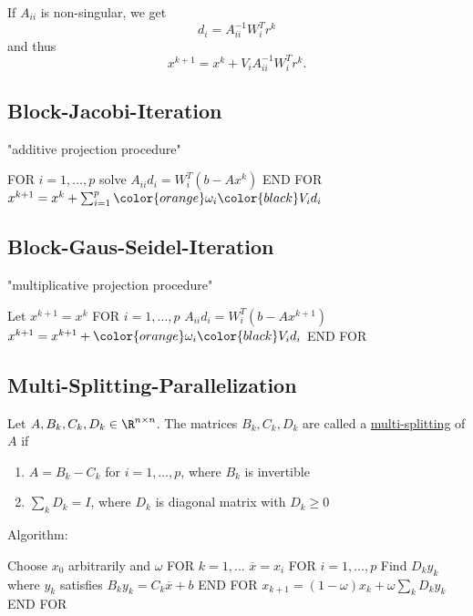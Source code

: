 If $A_{ii}$ is non-singular, we get
\[
d_{i} = A_{ii}^{-1} W_{i}^{T} r^{k}
\] 
and thus
\[
x^{k+1} = x^{k}+ V_{i}A_{ii}^{-1}W_{i}^{T} r^{k}
.\] 


\subsection*{Block-Jacobi-Iteration}
\label{sec:Block-Jacobi-Iteration}
"additive projection procedure"

FOR $i=1, \ldots, p$
	solve $A_{ii}d_{i} = W_{i}^{T}(b-Ax^{k})$
END FOR
$x^{k+1}= x^{k} + \sum_{i=1}^{p}{\color{orange}\omega _{i}\color{black}V_{i}d_{i}}$

\subsection*{Block-Gaus-Seidel-Iteration}
\label{sec:Block-Jacobi-Iteration}
"multiplicative projection procedure"

Let $x^{k+1} = x^{k}$
FOR $i=1, \ldots, p$
	$A_{ii}d_{i} = W_{i}^{T}(b-Ax^{k+1})$
	$x^{k+1} = x^{k+1} +\color{orange}\omega _{i}\color{black} V_{i}d_{i}$
END FOR

\subsection*{Multi-Splitting-Parallelization}
\label{sec:Multi-Splitting-Parallelization}

\begin{definition}
	Let $A, B_{k}, C_{k}, D_{k}\in \R^{n \times n}$.
	The matrices $B_{k}, C_{k}, D_{k}$ are called a \underline{multi-splitting} of $A$ if
	\begin{enumerate}[label=(\arabic{enumi})]
		\item $A = B_{k} - C_{k}$ for $i=1, \ldots, p$, where $B_{k}$ is invertible
		\item $\sum_{k}^{}{D_{k}} = I$, where $D_{k}$ is diagonal matrix with $D_{k} \geq  0$
	\end{enumerate}
\end{definition}

Algorithm:

Choose $x_0$ arbitrarily and $\omega $
FOR $k=1,\ldots $
	$\overline{x} = x_{i}$
	FOR $i=1, \ldots, p$
	Find $D_{k}y_{k}$ where $y_{k}$ satisfies $B_{k}y_{k} = C_{k}\overline{x}+b$
	END FOR
	$x_{k+1} = (1-\omega ) x_{k} + \omega \sum_{k}^{}{D_{k}y_{k}}$
END FOR
